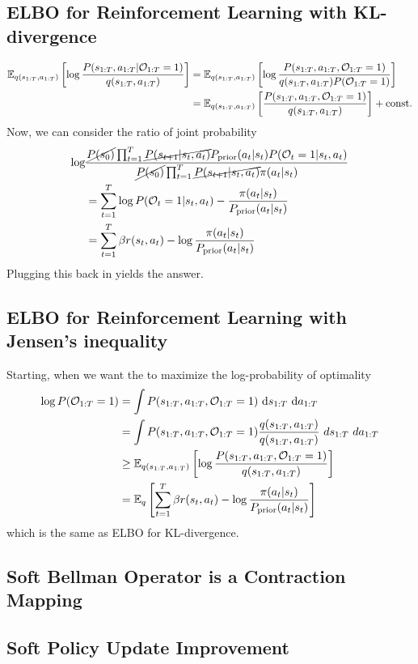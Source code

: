 \subsection{ELBO for Reinforcement Learning with KL-divergence}
\label{appx:chap2-ELBO-KL-Single}
\begin{equation*}
\begin{aligned}
    \mathbb{E}_{q(s_{1:T}, a_{1:T})}\left[ \log\frac{P(s_{1:T}, a_{1:T} | \mathcal{O}_{1:T} = 1)}{q(s_{1:T}, a_{1:T})} \right] &= \mathbb{E}_{q(s_{1:T}, a_{1:T})}\left[ \log\frac{P(s_{1:T}, a_{1:T} , \mathcal{O}_{1:T} = 1)}{q(s_{1:T}, a_{1:T}) P(\mathcal{O}_{1:T} = 1)} \right] \\
    &= \mathbb{E}_{q(s_{1:T}, a_{1:T})}\left[ \frac{P(s_{1:T}, a_{1:T} , \mathcal{O}_{1:T} = 1)}{q(s_{1:T}, a_{1:T})} \right] + \text{const.}
\end{aligned}
\end{equation*}
Now, we can consider the ratio of joint probability 
\begin{equation*}
\begin{aligned}
    \log &\frac{\cancel{P(s_0)} \prod^{T}_{t=1} \cancel{P(s_{t+1} | s_t, a_t)} P_{\text{prior}}(a_t | s_t) P(\mathcal{O}_t = 1 | s_t, a_t)}{\cancel{P(s_0)} \prod^{T}_{t=1} \cancel{P(s_{t+1} | s_t, a_t)} \pi(a_t | s_t) } \\
    &= \sum^T_{t=1} \log P(\mathcal{O}_t = 1 | s_t, a_t) - \frac{\pi(a_t | s_t)}{P_{\text{prior}}(a_t | s_t)} \\
    &= \sum^{T}_{t=1} \beta r(s_t, a_t) - \log \frac{\pi(a_t | s_t)}{P_{\text{prior}}(a_t | s_t)}
\end{aligned}
\end{equation*}
Plugging this back in yields the answer.

\subsection{ELBO for Reinforcement Learning with Jensen's inequality}
\label{appx:chap2-ELBO-Jensen-Single}
Starting, when we want the to maximize the log-probability of optimality 
\begin{equation*}
    \begin{aligned}
        \log P(\mathcal{O}_{1:T} = 1) &= \int P(s_{1:T}, a_{1:T}, \mathcal{O}_{1:T} = 1) \ \mathrm{d} s_{1:T} \ \mathrm{d} a_{1:T} \\ 
        &= \int P(s_{1:T}, a_{1:T}, \mathcal{O}_{1:T} = 1) \frac{q(s_{1:T}, a_{1:T})}{q(s_{1:T}, a_{1:T})} \ ds_{1:T} \ da_{1:T} \\
        &\ge \mathbb{E}_{q(s_{1:T}, a_{1:T})} \left[ \log \frac{P(s_{1:T}, a_{1:T}, \mathcal{O}_{1:T} = 1)}{q(s_{1:T}, a_{1:T})} \right] \\
        &=  \mathbb{E}_{q} \left[\sum^{T}_{t=1} \beta r(s_t, a_t) - \log \frac{\pi(a_t | s_t)}{P_{\text{prior}}(a_t | s_t)} \right]
    \end{aligned}
\end{equation*}
which is the same as ELBO for KL-divergence.

\subsection{Soft Bellman Operator is a Contraction Mapping}
\label{appx:chap2-soft-bellman-contract}

\subsection{Soft Policy Update Improvement}
\label{appx:chap2-soft-policy-update-improvement}